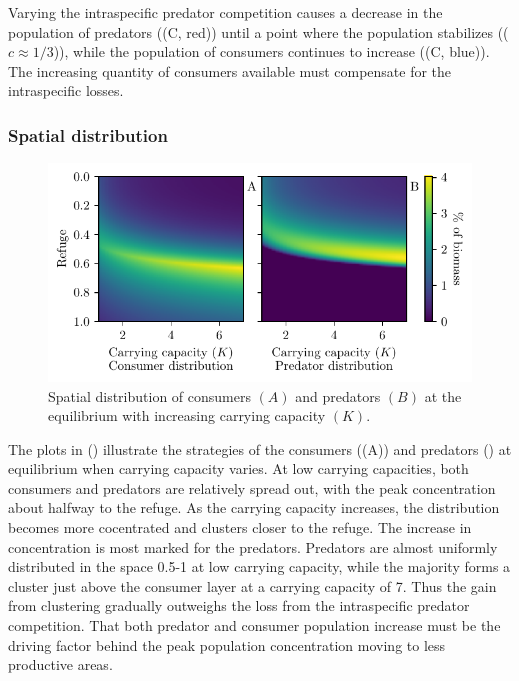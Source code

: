 Varying the intraspecific predator competition causes a decrease in the population of predators ((C, red)) until a point where the population stabilizes (($c\approx 1/3$)), while the population of consumers continues to increase ((C, blue)). The increasing quantity of consumers available must compensate for the intraspecific losses.

\subsubsection{Spatial distribution}
\begin{figure}[H]
  \caption{Spatial distribution of consumers $(A)$ and predators $(B)$ at the equilibrium with increasing carrying capacity $(K)$.}
  \label{fig:strat_car}
  \includegraphics{plots/increasing_car_cap_c.pdf}
\end{figure}
The plots in () illustrate the strategies of the consumers ((A)) and predators () at equilibrium when carrying capacity varies. At low carrying capacities, both consumers and predators are relatively spread out, with the peak concentration about halfway to the refuge. As the carrying capacity increases, the distribution becomes more cocentrated and clusters closer to the refuge. The increase in concentration is most marked for the predators. Predators are almost uniformly distributed in the space 0.5-1 at low carrying capacity, while the majority forms a cluster just above the consumer layer at a carrying capacity of 7. Thus the gain from clustering gradually outweighs the loss from the intraspecific predator competition. That both predator and consumer population increase must be the driving factor behind the peak population concentration moving to less productive areas.

